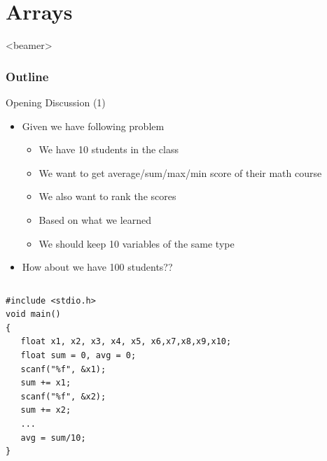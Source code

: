 \section{Arrays}
\label{sec:arry}
\begin{frame}<beamer>
    \frametitle{Outline}
    \tableofcontents[currentsection]
\end{frame}

\begin{frame}[fragile]{Opening Discussion (1)}

\begin{itemize}
	\item {Given we have following problem}
	\begin{itemize}
		\item {We have 10 students in the class}
		\item {We want to get average/sum/max/min score of their math course}
		\item {We also want to rank the scores}
		\item {Based on what we learned}
		\item {We should keep 10 variables of the same type}
	\end{itemize}
	\item {How about we have 100 students??}
\end{itemize}
\vspace{-0.10in}
\begin{columns}
\begin{column}{0.75\linewidth}
\begin{lstlisting}
#include <stdio.h>
void main()
{
   float x1, x2, x3, x4, x5, x6,x7,x8,x9,x10;
   float sum = 0, avg = 0;
   scanf("%f", &x1);
   sum += x1;
   scanf("%f", &x2);
   sum += x2;
   ...
   avg = sum/10;
}
\end{lstlisting}
\end{column}
\end{columns}
\end{frame}

